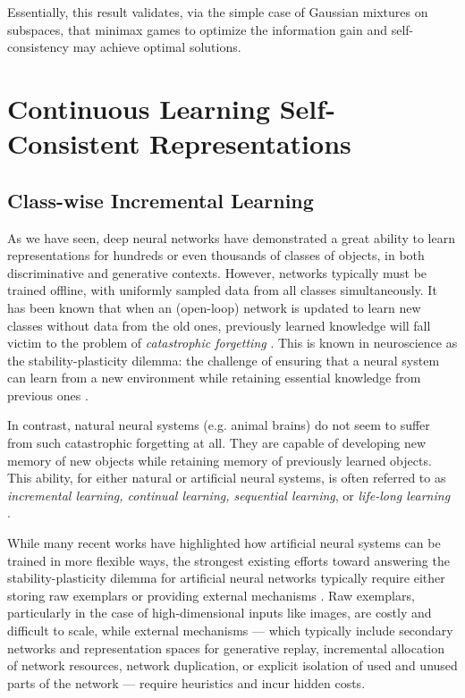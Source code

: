 \documentclass[../../book-main.tex]{subfiles}
\begin{document}
Essentially, this result validates, via the simple case of Gaussian mixtures on subspaces, that minimax games to optimize the information gain and self-consistency may achieve optimal solutions.






\section{Continuous Learning Self-Consistent Representations}
\label{sec:continuous}

\subsection{Class-wise Incremental Learning}
\label{sec:class-wise-incremental}

As we have seen, deep neural networks have demonstrated a great ability to learn representations for hundreds or even thousands of classes of objects, in both discriminative and generative contexts. However, networks typically must be trained offline, with uniformly sampled data from all classes simultaneously. It has been known that when an (open-loop) network is updated to learn new classes without data from the old ones, previously learned knowledge will fall victim to the problem of {\em catastrophic forgetting} \cite{McCloskey1989catastrophic}. This is known in neuroscience as the stability-plasticity dilemma: the challenge of ensuring that a neural system can learn from a new environment while retaining essential knowledge from previous ones \cite{Grossberg1987CompetitiveLF}.

In contrast, natural neural systems (e.g. animal brains) do not seem to suffer from such catastrophic forgetting at all. They are capable of developing new memory of new objects while retaining memory of previously learned objects. This ability, for either natural or artificial neural systems, is often referred to as {\em  incremental learning, continual learning, sequential learning}, or {\em life-long learning}~ \cite{controlled-forgetting}.



While many recent works have highlighted how artificial neural systems can be  trained in more flexible ways, the strongest existing efforts toward answering the stability-plasticity dilemma for artificial neural networks typically require either storing raw exemplars \cite{icarl,chaudhry2019tiny} or providing external mechanisms \cite{EWC}. Raw exemplars, particularly in the case of high-dimensional inputs like images, are costly and difficult to scale, while external mechanisms --- which typically include secondary networks and representation spaces for generative replay, incremental allocation of network resources, network duplication, or explicit isolation of used and unused parts of the network --- require heuristics and incur hidden costs.
\end{document}
